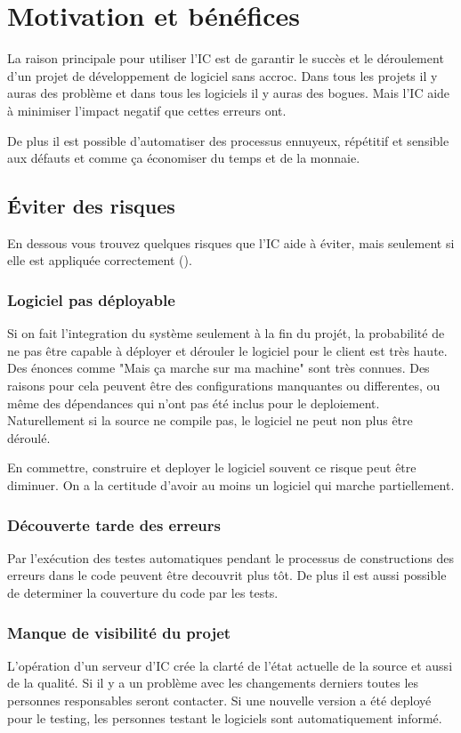 \section{Motivation et bénéfices}

La raison principale pour utiliser l'IC est de garantir le succès et le déroulement d'un projet de développement de logiciel sans accroc. Dans tous les projets il y auras des problème et dans tous les logiciels il y auras des bogues. Mais l'IC aide à minimiser  l'impact negatif que cettes erreurs ont.

De plus il est possible d'automatiser des processus ennuyeux, répétitif et sensible aux défauts et comme ça économiser du temps et de la monnaie. 

\subsection{Éviter des risques}

En dessous vous trouvez quelques risques que l'IC aide à éviter, mais seulement si elle est appliquée correctement ().

\subsubsection{Logiciel pas déployable}
Si on fait l'integration du système seulement à la fin du projét, la probabilité de ne pas être capable à déployer et dérouler le logiciel pour le client est très haute. Des énonces comme "Mais ça marche sur ma machine" sont très connues. Des raisons pour cela peuvent être des configurations manquantes ou differentes, ou même des dépendances qui n'ont pas été inclus pour le deploiement. Naturellement si la source ne compile pas, le logiciel ne peut non plus être déroulé.

En commettre, construire et deployer le logiciel souvent ce risque peut être diminuer. On a la certitude d'avoir au moins un logiciel qui marche partiellement.
\subsubsection{Découverte tarde des erreurs}
Par l'exécution des testes automatiques pendant le processus de constructions des erreurs dans le code peuvent être decouvrit plus tôt. De plus il est aussi possible de determiner la couverture du code par les tests.
\subsubsection{Manque de visibilité du projet}
L'opération d'un serveur d'IC crée la clarté de l'état actuelle de la source et aussi de la qualité. Si il y a un problème avec les changements derniers toutes les personnes responsables seront contacter. Si une nouvelle version a été deployé pour le testing, les personnes testant le logiciels sont automatiquement informé.

